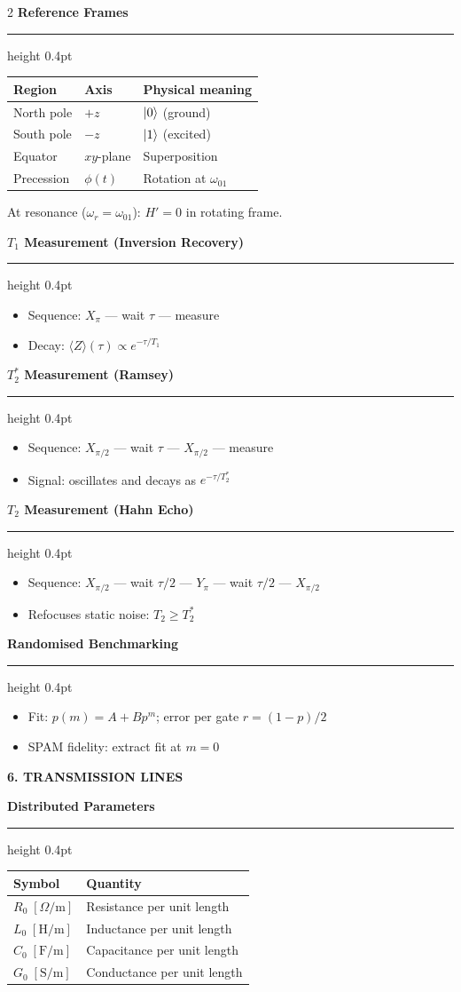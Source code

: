 \documentclass[10pt,a4paper]{article}
\newcommand{\sectionbox}[1]{%
  \vspace{3pt}%
  \noindent\colorbox{headerbg}{\parbox{\linewidth-2\fboxsep}%
    {\bfseries\small\color{white}\MakeUppercase{#1}}}%
  \vspace{1pt}%
}
\newcommand{\subsec}[1]{%
  \vspace{3pt}%
  {\small\bfseries\color{subseccolor}#1}%
  \vspace{1pt}\hrule height 0.4pt \vspace{2pt}%
}
\begin{document}
\begin{multicols}{2}
\subsec{Reference Frames}
\begin{center}
\small
\begin{tabular}{@{}lll@{}}
\toprule
Region & Axis & Physical meaning \\\midrule
North pole & $+z$ & $\ket{0}$ (ground) \\
South pole & $-z$ & $\ket{1}$ (excited) \\
Equator & $xy$-plane & Superposition \\
Precession & $\phi(t)$ & Rotation at $\omega_{01}$ \\\bottomrule
\end{tabular}
\end{center}
At resonance ($\omega_r=\omega_{01}$): $H'=0$ in rotating frame.

\subsec{$T_1$ Measurement (Inversion Recovery)}
\begin{itemize}
  \item Sequence: $X_\pi$ — wait $\tau$ — measure
  \item Decay: $\langle Z\rangle(\tau)\propto e^{-\tau/T_1}$
\end{itemize}

\subsec{$T_2^*$ Measurement (Ramsey)}
\begin{itemize}
  \item Sequence: $X_{\pi/2}$ — wait $\tau$ — $X_{\pi/2}$ — measure
  \item Signal: oscillates and decays as $e^{-\tau/T_2^*}$
\end{itemize}

\subsec{$T_2$ Measurement (Hahn Echo)}
\begin{itemize}
  \item Sequence: $X_{\pi/2}$ — wait $\tau/2$ — $Y_\pi$ — wait $\tau/2$ — $X_{\pi/2}$
  \item Refocuses static noise: $T_2\geq T_2^*$
\end{itemize}

\subsec{Randomised Benchmarking}
\begin{itemize}
  \item Fit: $p(m)=A+Bp^m$; error per gate $r=(1-p)/2$
  \item SPAM fidelity: extract fit at $m=0$
\end{itemize}

\sectionbox{6. Transmission Lines}

\subsec{Distributed Parameters}
\begin{center}
\small
\begin{tabular}{@{}ll@{}}
\toprule
Symbol & Quantity \\\midrule
$R_0\;[\Omega/\text{m}]$ & Resistance per unit length \\
$L_0\;[\text{H/m}]$ & Inductance per unit length \\
$C_0\;[\text{F/m}]$ & Capacitance per unit length \\
$G_0\;[\text{S/m}]$ & Conductance per unit length \\\bottomrule
\end{tabular}
\end{center}


\end{multicols}
\end{document}
